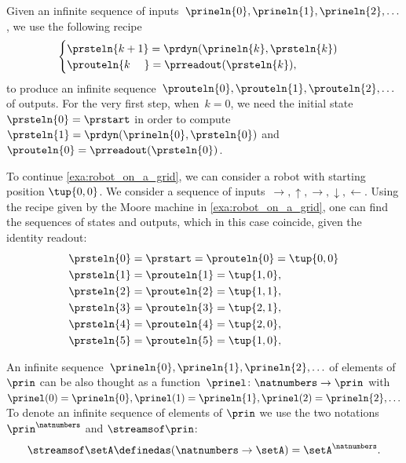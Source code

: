 Given an infinite sequence of inputs~$\prineln{0}, \prineln{1}, \prineln{2}, \ldots $, we use the following recipe
\begin{equation}
    \label{eq:Moore-action-recursion}
    \begin{cases}
        \prsteln{k+1} = \prdyn(\prineln{k}, \prsteln{k}) \\
        \prouteln{k\phantom{+1}} = \prreadout(\prsteln{k}),
    \end{cases}
\end{equation}
to produce an infinite sequence~$\prouteln{0}, \prouteln{1}, \prouteln{2}, \ldots$ of outputs.
For the very first step, when~$k = 0$, we need the initial state~$\prsteln{0} = \prstart$ in order to compute~$\prsteln{1} = \prdyn(\prineln{0}, \prsteln{0})$ and~$\prouteln{0} = \prreadout(\prsteln{0})$.

\begin{example}
    To continue \cref{exa:robot_on_a_grid}, we can consider a robot with starting position $\tup{0,0}$.
    We consider a sequence of inputs~$\rightarrow,\uparrow,\rightarrow,\downarrow,\leftarrow$.
    Using the recipe given by the Moore machine in \cref{exa:robot_on_a_grid}, one can find the sequences of states and outputs, which in this case coincide, given the identity readout:
    \begin{equation*}
        \begin{aligned}
            \prsteln{0} & =\prstart=\prouteln{0}=\tup{0,0} \\
            \prsteln{1} & =\prouteln{1}=\tup{1,0}, \\
            \prsteln{2} & =\prouteln{2}=\tup{1,1}, \\
            \prsteln{3} & =\prouteln{3}=\tup{2,1}, \\
            \prsteln{4} & =\prouteln{4}=\tup{2,0}, \\
            \prsteln{5} & =\prouteln{5}=\tup{1,0},
        \end{aligned}
    \end{equation*}
\end{example}

An infinite sequence~$\prineln{0}, \prineln{1}, \prineln{2}, \ldots$ of elements of~$\prin$ can be also thought as a function~$\prinel \colon \natnumbers \to \prin$ with~$\prinel(0) = \prineln{0}, \prinel(1) = \prineln{1}, \prinel(2) = \prineln{2}, \ldots$ \etc
To denote an infinite sequence of elements of $\prin$ we use the two notations $\prin^{\natnumbers}$ and $\streamsof\prin$:
\begin{equation}
    \streamsof \setA \definedas (\natnumbers \to \setA) = \setA^{\natnumbers}.
\end{equation}

